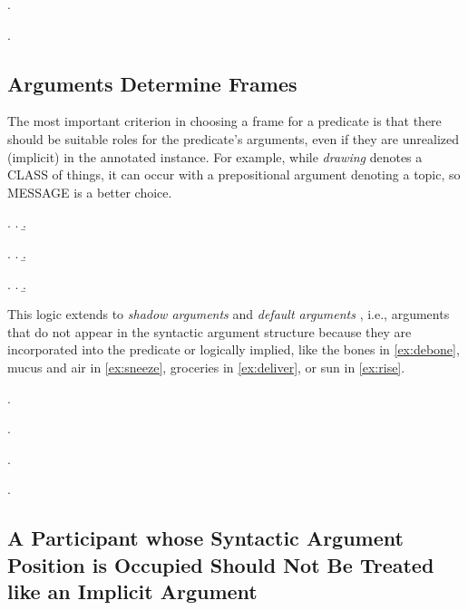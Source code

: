 \documentclass[a4paper]{article}
\newcommand{\fr}[1]{\textsf{#1}}
\newcommand{\rl}[1]{\textsf{#1}}
\begin{document}
\ex.

\ex.

\newpage\subsection{Arguments Determine Frames}

The most important criterion in choosing a frame for a predicate is that there
should be suitable roles for the predicate's arguments, even if they are
unrealized (implicit) in the annotated instance. For example, while
\emph{drawing} denotes a \fr{CLASS} of things, it can occur with a
prepositional argument denoting a \rl{topic}, so \fr{MESSAGE} is a better
choice.

\ex.
\a.
\b.

\ex.
\a.
\b.

\ex.
\a.
\b.

This logic extends to \emph{shadow arguments} and \emph{default arguments}
\citep{pustejovsky-1995-generative,di-fabio-etal-2019-verbatlas}, i.e., arguments
that do not appear in the syntactic argument structure because they are
incorporated into the predicate or logically implied, like the bones in
\ref{ex:debone}, mucus and air in \ref{ex:sneeze}, groceries in
\ref{ex:deliver}, or sun in \ref{ex:rise}.

\ex.\label{ex:debone}

\ex.\label{ex:sneeze}

\ex.\label{ex:deliver}

\ex.\label{ex:rise}

\newpage\subsection{A Participant whose Syntactic Argument Position is Occupied Should Not Be Treated like an Implicit Argument}
\end{document}
